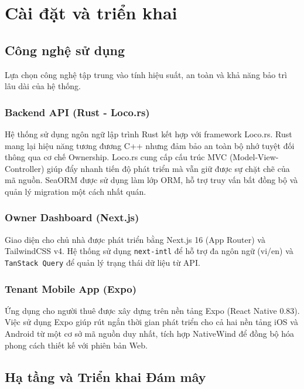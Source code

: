 \chapter{Cài đặt và triển khai}\label{chapter_impl}

\section{Công nghệ sử dụng}

Lựa chọn công nghệ tập trung vào tính hiệu suất, an toàn và khả năng bảo trì lâu dài của hệ thống.

\subsection{Backend API (Rust - Loco.rs)}

Hệ thống sử dụng ngôn ngữ lập trình Rust kết hợp với framework Loco.rs. Rust mang lại hiệu năng tương đương C++ nhưng đảm bảo an toàn bộ nhớ tuyệt đối thông qua cơ chế Ownership. Loco.rs cung cấp cấu trúc MVC (Model-View-Controller) giúp đẩy nhanh tiến độ phát triển mà vẫn giữ được sự chặt chẽ của mã nguồn. SeaORM được sử dụng làm lớp ORM, hỗ trợ truy vấn bất đồng bộ và quản lý migration một cách nhất quán.

\subsection{Owner Dashboard (Next.js)}

Giao diện cho chủ nhà được phát triển bằng Next.js 16 (App Router) và TailwindCSS v4. Hệ thống sử dụng \texttt{next-intl} để hỗ trợ đa ngôn ngữ (vi/en) và \texttt{TanStack Query} để quản lý trạng thái dữ liệu từ API.

\subsection{Tenant Mobile App (Expo)}

Ứng dụng cho người thuê được xây dựng trên nền tảng Expo (React Native 0.83). Việc sử dụng Expo giúp rút ngắn thời gian phát triển cho cả hai nền tảng iOS và Android từ một cơ sở mã nguồn duy nhất, tích hợp NativeWind để đồng bộ hóa phong cách thiết kế với phiên bản Web.

\section{Hạ tầng và Triển khai Đám mây}

